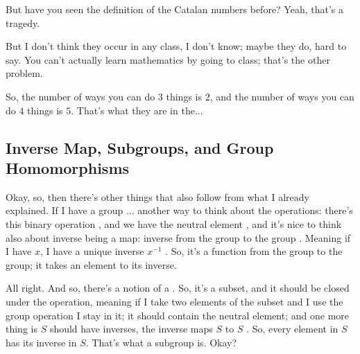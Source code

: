 \begin{speech}[00:55:19 - 00:56:29]
But have you seen the definition of the Catalan numbers before? Yeah, that's a tragedy.

 But I don't think they occur in any class, I don't know; maybe they do, hard to say. You can't actually learn mathematics by going to class; that's the other problem.

So, the number of ways you can do $3$ things is $2$, and the number of ways you can do $4$ things is $5$. That's what they are in the...
\end{speech}

\begin{hidden}
\end{hidden}

\subsection{Inverse Map, Subgroups, and Group Homomorphisms}

\begin{speech}[00:56:29 - 00:57:52]
Okay, so, then there's other things that also follow from what I already explained. If I have a group ... another way to think about the operations: there's this binary operation , and we have the neutral element , and it's nice to think also about inverse being a map: inverse from the group to the group . Meaning if I have $x$, I have a unique inverse $x^{-1}$ . So, it's a function from the group to the group; it takes an element to its inverse.

All right. And so, there's a notion of a  . So, it's a subset, and it should be closed under the operation, meaning if I take two elements of the subset and I use the group operation I stay in it; it should contain the neutral element; and one more thing is $S$ should have inverses, the inverse maps $S$ to $S$ . So, every element in $S$ has its inverse in $S$. That's what a subgroup is. Okay?
\end{speech}

